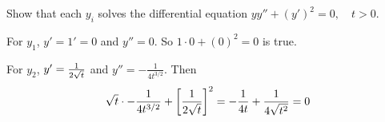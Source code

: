 Show that each $y_i$ solves the differential equation $yy'' + (y')^2 = 0, \quad t>0.$

\soln For $y_1$, $y' = 1' = 0$ and $y'' = 0$. So $1 \cdot 0 + (0)^2 = 0$ is true. 

\nl For $y_2$, $y' = \over{2\sqrt{t}}$ and $y'' = -\frac{1}{4t^{3/2}}$. Then
$$\sqrt{t} \cdot -\frac{1}{4t^{3/2}} + \biggbrac{\over{2\sqrt{t}}}^2 = -\over{4t} + \over{4 \sqrt{t^2}} = 0$$
